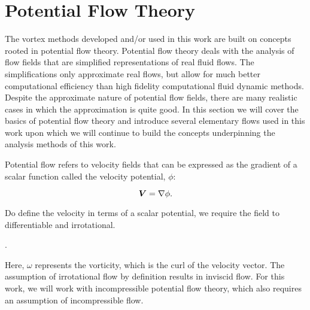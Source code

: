 \section{Potential Flow Theory}
\label{ssec:potentialflow}

The vortex methods developed and/or used in this work are built on concepts rooted in potential flow theory.
%
Potential flow theory deals with the analysis of flow fields that are simplified representations of real fluid flows.
%
The simplifications only approximate real flows, but allow for much better computational efficiency than high fidelity computational fluid dynamic methods.
%
Despite the approximate nature of potential flow fields, there are many realistic cases in which the approximation is quite good.
%
In this section we will cover the basics of potential flow theory and introduce several elementary flows used in this work upon which we will continue to build the concepts underpinning the analysis methods of this work.

Potential flow refers to velocity fields that can be expressed as the gradient of a scalar function called the velocity potential, \(\phi\):

\begin{equation}
    \label{eqn:velocity_potential}
    \bm{V} = \nabla \phi.
\end{equation}

Do define the velocity in terms of a scalar potential, we require the field to differentiable and irrotational.

\begin{assumption}{}
    \label{asm:irrotational}


    .


\end{assumption}

\noindent Here, \(\omega\) represents the vorticity, which is the curl of the velocity vector.
%
The assumption of irrotational flow by definition results in inviscid flow.
%
For this work, we will work with incompressible potential flow theory, which also requires an assumption of incompressible flow.

